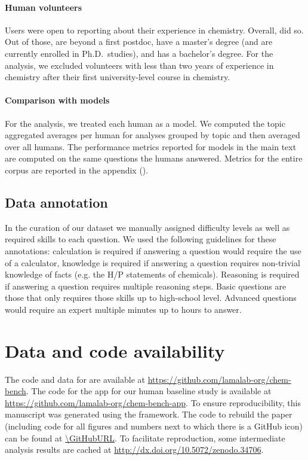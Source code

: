 \documentclass[11pt, oneside]{article}
\begin{document}
\begin{refsection}
\paragraph{Human volunteers}
Users were open to reporting about their experience in chemistry.
Overall,  did so.
Out of those,  are beyond a first postdoc,  have a master's degree (and are currently enrolled in Ph.D.\ studies), and  has a bachelor's degree. For the analysis, we excluded volunteers with less than two years of experience in chemistry after their first university-level course in chemistry.


\paragraph{Comparison with models}
For the analysis, we treated each human as a model. We computed the topic aggregated averages per human for analyses grouped by topic and then averaged over all humans. The performance metrics reported for models in the main text are computed on the same questions the humans answered. Metrics for the entire corpus are reported in the appendix ().

\subsection{Data annotation}\label{sec:meth-topic}
In the curation of our dataset we manually assigned difficulty levels as well as required skills to each question. We used the following guidelines for these annotations: calculation is required if answering a question would require the use of a calculator, knowledge is required if answering a question requires non-trivial knowledge of facts (e.g. the H/P statements of chemicals). Reasoning is required if answering a question requires multiple reasoning steps.
Basic questions are those that only requires those skills up to high-school level. Advanced questions would require an expert multiple minutes up to hours to answer.

\section*{Data and code availability}
The code and data for \chembench are available at \url{https://github.com/lamalab-org/chem-bench}.
The code for the app for our human baseline study is available at \url{https://github.com/lamalab-org/chem-bench-app}.
To ensure reproducibility, this manuscript was generated using the \href{https://show-your.work/en/latest/}{\showyourwork} framework.\autocite{Luger2021}
The code to rebuild the paper (including code for all figures and numbers next to which there is a GitHub icon) can be found at \url{\GitHubURL}.
To facilitate reproduction, some intermediate analysis results are cached at \url{http://dx.doi.org/10.5072/zenodo.34706}.


\end{refsection}
\end{document}
